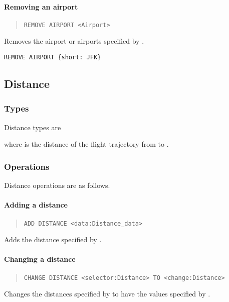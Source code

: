 \paragraph{Removing an airport}
\begin{quote}
  \lstinline{REMOVE AIRPORT <Airport>}
\end{quote}
Removes the airport or airports specified by .
\begin{texa}
  \lstinline|REMOVE AIRPORT {short: JFK}|
\end{texa}

\subsection{Distance}
\subsubsection{Types}
Distance types are
\begin{description}
  \item[] 
  \item[] 
\end{description}
where  is the distance of the flight trajectory from  to
.
\subsubsection{Operations}
Distance operations are as follows.

\paragraph{Adding a distance}
\begin{quote}
  \lstinline{ADD DISTANCE <data:Distance_data>}
\end{quote}
Adds the distance specified by .
\paragraph{Changing a distance}
\begin{quote}
  \lstinline{CHANGE DISTANCE <selector:Distance> TO <change:Distance>}
\end{quote}
Changes the distances specified by  to have the values specified
by .
